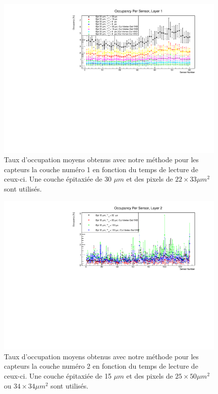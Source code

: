 \begin{appendices}
  \begin{figure}[!htb]
    \begin{center}
      \includegraphics[scale=0.80]{./figures/sensors_Readout_Time/resultOccupancyPerSensor/occupancyPerSensor_Layer1_epi30um.pdf}
      \caption{Taux d'occupation moyens obtenus avec notre m\'ethode pour les capteurs la couche num\'ero 1 en fonction du temps de lecture de ceux-ci. Une couche \'epitaxi\'ee de 30 $\mu m$ et des pixels de $22 \times 33 \mu m^2$ sont utilis\'es.}
      \label{fig:OccupancyLayer1_epi30um}
    \end{center}
  \end{figure}
  
   \begin{figure}[!htb]
    \begin{center}
      \includegraphics[scale=0.80]{./figures/sensors_Readout_Time/resultOccupancyPerSensor/occupancyPerSensor_Layer2_epi15um.pdf}
      \caption{Taux d'occupation moyens obtenus avec notre m\'ethode pour les capteurs la couche num\'ero 2 en fonction du temps de lecture de ceux-ci. Une couche \'epitaxi\'ee de 15 $\mu m$ et des pixels de $25 \times 50 \mu m^2$ ou $34 \times 34 \mu m^2$ sont utilis\'es.}
      \label{fig:OccupancyLayer2_epi15um}
    \end{center}
  \end{figure}


\end{appendices}
